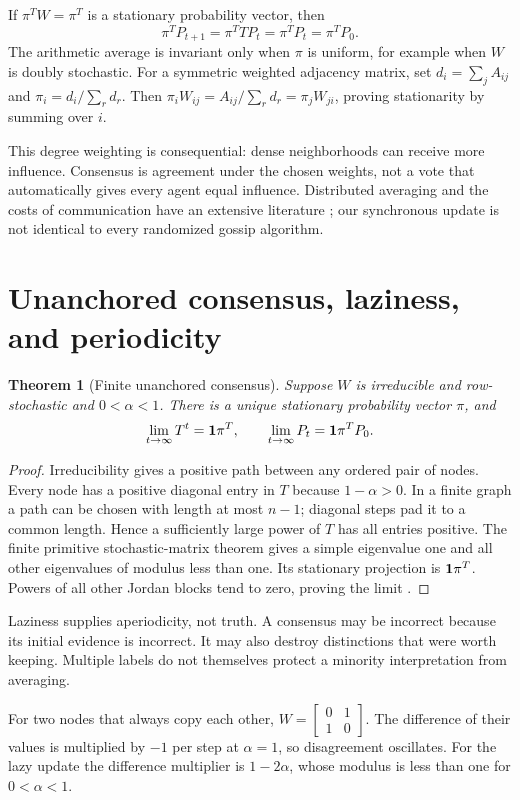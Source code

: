 \documentclass[12pt]{article}
\newtheorem{theorem}{Theorem}\newtheorem{proposition}[theorem]{Proposition}\newtheorem{lemma}[theorem]{Lemma}
\newcommand{\page}[1]{\section{#1}}
\begin{document}
If $\pi^TW=\pi^T$ is a stationary probability vector, then
\begin{equation}\pi^TP_{t+1}=\pi^TTP_t=\pi^TP_t=\pi^TP_0.\end{equation}
The arithmetic average is invariant only when $\pi$ is uniform, for example when $W$ is doubly stochastic. For a symmetric weighted adjacency matrix, set $d_i=\sum_jA_{ij}$ and $\pi_i=d_i/\sum_rd_r$. Then $\pi_iW_{ij}=A_{ij}/\sum_rd_r=\pi_jW_{ji}$, proving stationarity by summing over $i$.

This degree weighting is consequential: dense neighborhoods can receive more influence. Consensus is agreement under the chosen weights, not a vote that automatically gives every agent equal influence. Distributed averaging and the costs of communication have an extensive literature \cite{boyd}; our synchronous update is not identical to every randomized gossip algorithm.

\page{Unanchored consensus, laziness, and periodicity}
\begin{theorem}[Finite unanchored consensus]
Suppose $W$ is irreducible and row-stochastic and $0<\alpha<1$. There is a unique stationary probability vector $\pi$, and
\begin{equation}\lim_{t\to\infty}T^t=\mathbf1\pi^T,\qquad\lim_{t\to\infty}P_t=\mathbf1\pi^TP_0.\end{equation}
\end{theorem}
\begin{proof}
Irreducibility gives a positive path between any ordered pair of nodes. Every node has a positive diagonal entry in $T$ because $1-\alpha>0$. In a finite graph a path can be chosen with length at most $n-1$; diagonal steps pad it to a common length. Hence a sufficiently large power of $T$ has all entries positive. The finite primitive stochastic-matrix theorem gives a simple eigenvalue one and all other eigenvalues of modulus less than one. Its stationary projection is $\mathbf1\pi^T$. Powers of all other Jordan blocks tend to zero, proving the limit \cite{levin}.
\end{proof}
Laziness supplies aperiodicity, not truth. A consensus may be incorrect because its initial evidence is incorrect. It may also destroy distinctions that were worth keeping. Multiple labels do not themselves protect a minority interpretation from averaging.

For two nodes that always copy each other, $W=\left[\begin{smallmatrix}0&1\\1&0\end{smallmatrix}\right]$. The difference of their values is multiplied by $-1$ per step at $\alpha=1$, so disagreement oscillates. For the lazy update the difference multiplier is $1-2\alpha$, whose modulus is less than one for $0<\alpha<1$.
\end{document}
